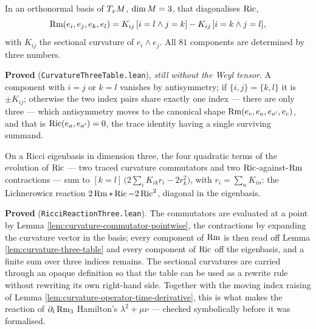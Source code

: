 \begin{lemma}
  \label{lem:curvature-three-table}
  \leanok
  In an orthonormal basis of $T_xM$, $\dim M = 3$, that diagonalises $\operatorname{Ric}$,
  \[
    \operatorname{Rm}(e_i,e_j,e_k,e_l) = K_{ij}\,[i=l \wedge j=k] - K_{ij}\,[i=k \wedge j=l],
  \]
  with $K_{ij}$ the sectional curvature of $e_i\wedge e_j$. All $81$ components are determined
  by three numbers.

  \textbf{Proved} (\texttt{CurvatureThreeTable.lean}), \emph{still without the Weyl tensor}.
  A component with $i=j$ or $k=l$ vanishes by antisymmetry; if $\{i,j\}=\{k,l\}$ it is
  $\pm K_{ij}$; otherwise the two index pairs share exactly one index --- there are only three
  --- which antisymmetry moves to the canonical shape $\operatorname{Rm}(e_c,e_a,e_{a'},e_c)$, and that is
  $\operatorname{Ric}(e_a,e_{a'}) = 0$, the trace identity having a single surviving summand.
\end{lemma}

\begin{lemma}
  \label{lem:ricci-reaction-three}
  \leanok
  On a Ricci eigenbasis in dimension three, the four quadratic terms of the evolution of
  $\operatorname{Ric}$ --- two traced curvature commutators and two $\operatorname{Ric}$-against-$\operatorname{Rm}$ contractions ---
  sum to $[k=l]\,\big(2\sum_i K_{ik} r_i - 2 r_k^2\big)$, with $r_i = \sum_n K_{in}$: the
  Lichnerowicz reaction $2\operatorname{Rm}*\operatorname{Ric} - 2\operatorname{Ric}^2$, diagonal in the eigenbasis.

  \textbf{Proved} (\texttt{RicciReactionThree.lean}). The commutators are evaluated at a point
  by Lemma \ref{lem:curvature-commutator-pointwise}, the contractions by expanding the curvature
  vector in the basis; every component of $\operatorname{Rm}$ is then read off Lemma
  \ref{lem:curvature-three-table} and every component of $\operatorname{Ric}$ off the eigenbasis, and a
  finite sum over three indices remains. The sectional curvatures are carried through an opaque
  definition so that the table can be used as a rewrite rule without rewriting its own
  right-hand side. Together with the moving index raising of Lemma
  \ref{lem:curvature-operator-time-derivative}, this is what makes the reaction of
  $\partial_t\operatorname{Rm}_3$ Hamilton's $\lambda^2 + \mu\nu$ --- checked symbolically before it was
  formalised.
\end{lemma}

